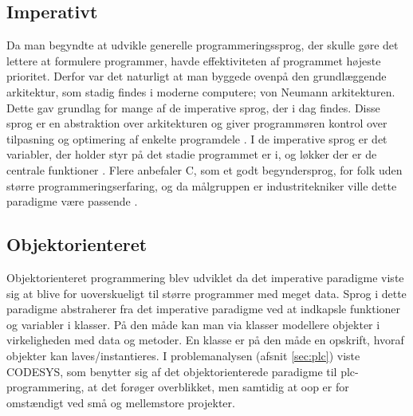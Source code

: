 \tocless \subsection{Imperativt}
\label{sec:c_is_easy2}
Da man begyndte at udvikle generelle programmeringssprog, der skulle gøre det lettere at formulere programmer, havde effektiviteten af programmet højeste prioritet. Derfor var det naturligt at man byggede ovenpå den grundlæggende arkitektur, som stadig findes i moderne computere; von Neumann arkitekturen. Dette gav grundlag for mange af de imperative sprog, der i dag findes. Disse sprog er en abstraktion over arkitekturen og giver programmøren kontrol over tilpasning og optimering af enkelte programdele \cite{Sebesta_2013}. I de imperative sprog er det variabler, der holder styr på det stadie programmet er i, og løkker der er de centrale funktioner \cite{Sebesta_2013}. Flere anbefaler C, som et godt begyndersprog, for folk uden større programmeringserfaring, og da målgruppen er industritekniker ville dette paradigme være passende \cite{c_is_easy}.

\tocless \subsection{Objektorienteret}
Objektorienteret programmering blev udviklet da det imperative paradigme viste sig at blive for uoverskueligt til større programmer med meget data. Sprog i dette paradigme abstraherer fra det imperative paradigme ved at indkapsle funktioner og variabler i klasser. På den måde kan man via klasser modellere objekter i virkeligheden med data og metoder. En klasse er på den måde en opskrift, hvoraf objekter kan laves/instantieres. I problemanalysen (afsnit \ref{sec:plc}) viste CODESYS, som benytter sig af det objektorienterede paradigme til \gls{plc}-programmering, at det forøger overblikket, men samtidig at \gls{oop} er for omstændigt ved små og mellemstore projekter.


